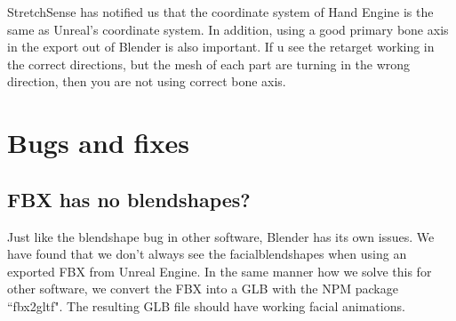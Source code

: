 \documentclass{uva-inf-article}
\begin{document}
StretchSense has notified us that the coordinate system of Hand Engine is the same as Unreal's coordinate system. In addition, using a good primary bone axis in the export out of Blender is also important. If u see the retarget working in the correct directions, but the mesh of each part are turning in the wrong direction, then you are not using correct bone axis.


\section{Bugs and fixes}
\subsection{FBX has no blendshapes?}
Just like the blendshape bug in other software, Blender has its own issues. We have found that we don't always see the facialblendshapes when using an exported FBX from Unreal Engine. In the same manner how we solve this for other software, we convert the FBX into a GLB with the NPM package ``fbx2gltf". The resulting GLB file should have working facial animations.
\end{document}
